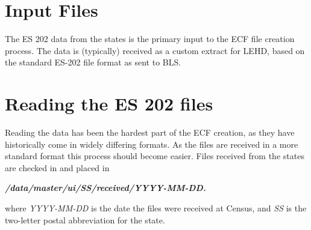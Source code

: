                       

%
%

\section{Input Files}

The ES 202 data from the states is the primary input to the ECF file
creation process. The data is (typically) received as a custom extract for
LEHD, based on the standard ES-202 file format as sent to BLS.

\section{Reading the ES 202 files}

Reading the data has been the hardest part of the ECF creation, as they
have historically come in widely differing formats. As the files are
received in a more standard format this process should become easier.
Files  received from the states are checked in and  placed in
\begin{center}
\textbf{\textit{/data/master/ui/SS/received/YYYY-MM-DD.}}   
\end{center}
where \textit{YYYY-MM-DD} is the date the files were received at
Census, and \textit{SS} is the two-letter postal abbreviation for the state.

